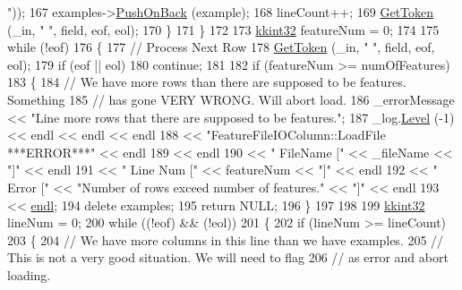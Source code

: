 \begin{DoxyCode}
{      "}));
167       examples->\hyperlink{class_k_k_m_l_l_1_1_feature_vector_list_abd43779a90a6aa3db1de8092be877bdb}{PushOnBack} (example);
168       lineCount++;
169       \hyperlink{class_k_k_m_l_l_1_1_feature_file_i_o_ae79ac82b32e63fa7e7d96c833b5631f2}{GetToken} (\_in, \textcolor{stringliteral}{" "}, field, eof, eol);
170     \}
171   \}
172 
173   \hyperlink{namespace_k_k_b_a8fa4952cc84fda1de4bec1fbdd8d5b1b}{kkint32}  featureNum = 0;
174 
175   \textcolor{keywordflow}{while}  (!eof)
176   \{
177     \textcolor{comment}{// Process Next Row}
178     \hyperlink{class_k_k_m_l_l_1_1_feature_file_i_o_ae79ac82b32e63fa7e7d96c833b5631f2}{GetToken} (\_in, \textcolor{stringliteral}{" "}, field, eof, eol);
179     \textcolor{keywordflow}{if}  (eof  ||  eol)
180       \textcolor{keywordflow}{continue};
181 
182     \textcolor{keywordflow}{if}  (featureNum >= numOfFeatures)
183     \{
184       \textcolor{comment}{// We have more rows than there are supposed to be features.  Something }
185       \textcolor{comment}{// has gone VERY WRONG.  Will abort load.}
186       \_errorMessage << \textcolor{stringliteral}{"Line more rows that there are supposed to be features."};
187       \_log.\hyperlink{class_k_k_b_1_1_run_log_a32cf761d7f2e747465fd80533fdbb659}{Level} (-1) << endl << endl << endl
188                       << \textcolor{stringliteral}{"FeatureFileIOColumn::LoadFile    ***ERROR***"} << endl
189                       << endl
190                       << \textcolor{stringliteral}{"          FileName ["} << \_fileName    << \textcolor{stringliteral}{"]"} << endl
191                       << \textcolor{stringliteral}{"          Line Num ["} << featureNum   << \textcolor{stringliteral}{"]"} << endl
192                       << \textcolor{stringliteral}{"          Error    ["} << \textcolor{stringliteral}{"Number of rows exceed number of features."} << \textcolor{stringliteral}{"]"} << 
      endl
193                       << \hyperlink{namespace_k_k_b_ad1f50f65af6adc8fa9e6f62d007818a8}{endl};
194       \textcolor{keyword}{delete}  examples;
195       \textcolor{keywordflow}{return}  NULL;
196     \}
197 
198 
199     \hyperlink{namespace_k_k_b_a8fa4952cc84fda1de4bec1fbdd8d5b1b}{kkint32}  lineNum = 0;
200     \textcolor{keywordflow}{while}  ((!eof)  &&  (!eol))
201     \{
202       \textcolor{keywordflow}{if}  (lineNum >= lineCount)
203       \{
204         \textcolor{comment}{// We have more columns in this line than we have examples.}
205         \textcolor{comment}{// This is not a very good situation.  We will need to flag }
206         \textcolor{comment}{// as error and abort loading.}

\end{DoxyCode}
